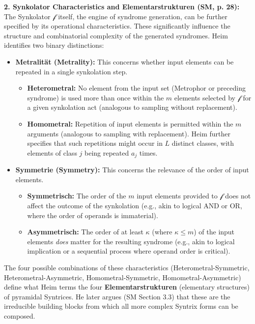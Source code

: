 \documentclass[
    12pt,              %
    a4paper,           %
    headings=normal,   %
    twoside=true,      %
    BCOR=8mm,          %
]{scrbook}
\newcommand{\synkolator}{\mathcal{f}}
\newcommand{\synkolationsstufe}{m}
\begin{document}
\textbf{2. Synkolator Characteristics and Elementarstrukturen (SM, p. 28):}
The Synkolator \(\synkolator\) itself, the engine of syndrome generation, can be further specified by its operational characteristics. These significantly influence the structure and combinatorial complexity of the generated syndromes. Heim identifies two binary distinctions:

\begin{itemize}
    \item   \textbf{Metralität (Metrality):} This concerns whether input elements can be repeated in a single synkolation step.
        \begin{itemize}
            \item   \textbf{Heterometral:} No element from the input set (Metrophor or preceding syndrome) is used more than once within the \(\synkolationsstufe\) elements selected by \(\synkolator\) for a given synkolation act (analogous to sampling without replacement).
            \item   \textbf{Homometral:} Repetition of input elements is permitted within the \(\synkolationsstufe\) arguments (analogous to sampling with replacement). Heim further specifies that such repetitions might occur in \(L\) distinct classes, with elements of class \(j\) being repeated \(a_j\) times.
        \end{itemize}
    \item   \textbf{Symmetrie (Symmetry):} This concerns the relevance of the order of input elements.
        \begin{itemize}
            \item   \textbf{Symmetrisch:} The order of the \(\synkolationsstufe\) input elements provided to \(\synkolator\) does not affect the outcome of the synkolation (e.g., akin to logical AND or OR, where the order of operands is immaterial).
            \item   \textbf{Asymmetrisch:} The order of at least \(\kappa\) (where \(\kappa \le \synkolationsstufe\)) of the input elements \textit{does} matter for the resulting syndrome (e.g., akin to logical implication or a sequential process where operand order is critical).
        \end{itemize}
\end{itemize}
The four possible combinations of these characteristics (Heterometral-Symmetric, Heterometral-Asymmetric, Homometral-Symmetric, Homometral-Asymmetric) define what Heim terms the four \textbf{Elementarstrukturen} (elementary structures) of pyramidal Syntrices. He later argues (SM Section 3.3) that these are the irreducible building blocks from which all more complex Syntrix forms can be composed.
\end{document}
